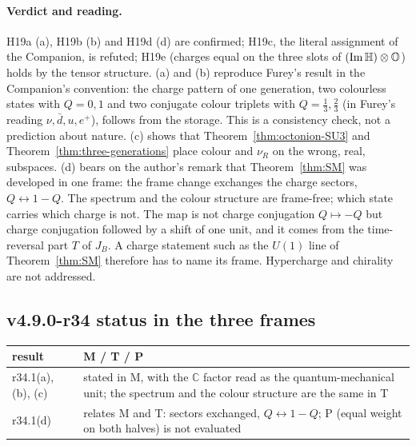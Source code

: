 \paragraph{Verdict and reading.}
H19a (a), H19b (b) and H19d (d) are confirmed; H19c, the literal assignment of the Companion, is refuted; H19e (charges equal on
the three slots of \((\operatorname{Im}\mathbb{H})\otimes\mathbb{O}\)) holds by the tensor structure.  (a) and (b) reproduce Furey's result in
the Companion's convention: the charge pattern of one generation, two colourless states with \(Q=0,1\) and two conjugate colour
triplets with \(Q=\tfrac13,\tfrac23\) (in Furey's reading \(\nu,\bar d,u,e^+\)), follows from the storage.  This is a consistency
check, not a prediction about nature.  (c) shows that Theorem~\ref{thm:octonion-SU3} and Theorem~\ref{thm:three-generations}
place colour and \(\nu_R\) on the wrong, real, subspaces.  (d) bears on the author's remark that Theorem~\ref{thm:SM} was
developed in one frame: the frame change exchanges the charge sectors, \(Q\leftrightarrow1-Q\).  The spectrum and the colour
structure are frame-free; which state carries which charge is not.  The map is not charge conjugation \(Q\mapsto-Q\) but charge
conjugation followed by a shift of one unit, and it comes from the time-reversal part \(T\) of \(J_B\).  A charge statement
such as the \(U(1)\) line of Theorem~\ref{thm:SM} therefore has to name its frame.  Hypercharge and chirality are not
addressed.

\subsection*{v4.9.0-r34 status in the three frames}
\label{subsec:v490-r34-frames}

\begin{center}
\small
\begin{tabular}{@{}>{\raggedright\arraybackslash}p{}>{\raggedright\arraybackslash}p{}@{}}
\toprule
result & M / T / P\\
\midrule
r34.1(a), (b), (c) & stated in M, with the \(\mathbb C\) factor read as the quantum-mechanical unit; the spectrum and the colour structure are the same in T\\
r34.1(d) & relates M and T: sectors exchanged, \(Q\leftrightarrow1-Q\); P (equal weight on both halves) is not evaluated\\
\bottomrule
\end{tabular}
\end{center}

